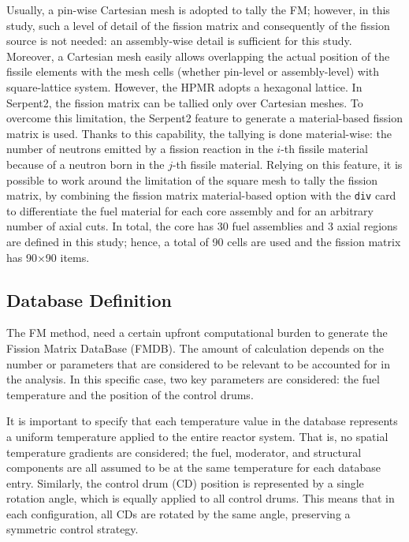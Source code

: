 \documentclass[preprint,review,12pt]{elsarticle}
\begin{document}
Usually, a pin-wise Cartesian mesh is adopted to tally the FM; however, in this study, such a level of detail of the fission matrix and consequently of the fission source is not needed: an assembly-wise detail is sufficient for this study.
Moreover, a Cartesian mesh easily allows overlapping the actual position of the fissile elements with the mesh cells (whether pin-level or assembly-level) with square-lattice system. However, the HPMR adopts a hexagonal lattice. In Serpent2, the fission matrix can be tallied only over Cartesian meshes. To overcome this limitation, the Serpent2 feature to generate a material-based fission matrix is used. Thanks to this capability, the tallying is done material-wise: the number of neutrons emitted by a fission reaction in the $i$-th fissile material because of a neutron born in the $j$-th fissile material. Relying on this feature, it is possible to work around the limitation of the square mesh to tally the fission matrix, by combining the fission matrix material-based option with the \texttt{div} card to differentiate the fuel material for each core assembly and for an arbitrary number of axial cuts. In total, the core has 30 fuel assemblies and 3 axial regions are defined in this study; hence, a total of 90 cells are used and the fission matrix has 90×90 items.



\subsection{Database Definition} \label{subsection:Database definition}
The FM method, need a certain upfront computational burden to generate the Fission Matrix DataBase (FMDB). The amount of calculation depends on the number or parameters that are considered to be relevant to be accounted for in the analysis.
In this specific case, two key parameters are considered: the fuel temperature and the position of the control drums.

It is important to specify that each temperature value in the database represents a uniform temperature applied to the entire reactor system. That is, no spatial temperature gradients are considered; the fuel, moderator, and structural components are all assumed to be at the same temperature for each database entry. Similarly, the control drum (CD) position is represented by a single rotation angle, which is equally applied to all control drums. This means that in each configuration, all CDs are rotated by the same angle, preserving a symmetric control strategy.
\end{document}
